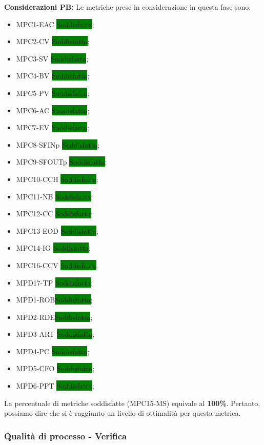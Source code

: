 \bigskip
\noindent \textbf{Considerazioni PB:}
Le metriche prese in considerazione in questa fase sono:
\begin{itemize}
    \item MPC1-EAC \colorbox{green}{Soddisfatta};
    \item MPC2-CV \colorbox{green}{Soddisfatta};
    \item MPC3-SV \colorbox{green}{Soddisfatta};
    \item MPC4-BV \colorbox{green}{Soddisfatta};
    \item MPC5-PV \colorbox{green}{Soddisfatta};
    \item MPC6-AC \colorbox{green}{Soddisfatta};
    \item MPC7-EV \colorbox{green}{Soddisfatta};
    \item MPC8-SFINp \colorbox{green}{Soddisfatta};
    \item MPC9-SFOUTp \colorbox{green}{Soddisfatta};
    \item MPC10-CCH \colorbox{green}{Soddisfatta};
    \item MPC11-NB \colorbox{green}{Soddisfatta};
    \item MPC12-CC \colorbox{green}{Soddisfatta};
    \item MPC13-EOD \colorbox{green}{Soddisfatta};
    \item MPC14-IG \colorbox{green}{Soddisfatta};
    \item MPC16-CCV \colorbox{green}{Soddisfatta}.
    \item MPD17-TP \colorbox{green}{Soddisfatta};
    \item MPD1-ROB\colorbox{green}{Soddisfatta};
    \item MPD2-RDE\colorbox{green}{Soddisfatta};
    \item MPD3-ART \colorbox{green}{Soddisfatta};
    \item MPD4-PC \colorbox{green}{Soddisfatta};
    \item MPD5-CFO \colorbox{green}{Soddisfatta};
    \item MPD6-PPT \colorbox{green}{Soddisfatta};
\end{itemize}
\noindent La percentuale di metriche soddisfatte (MPC15-MS) equivale al \textbf{100\%}. Pertanto, possiamo dire che si è raggiunto un livello di ottimalità per questa metrica.


\subsubsection{Qualità di processo - Verifica}
